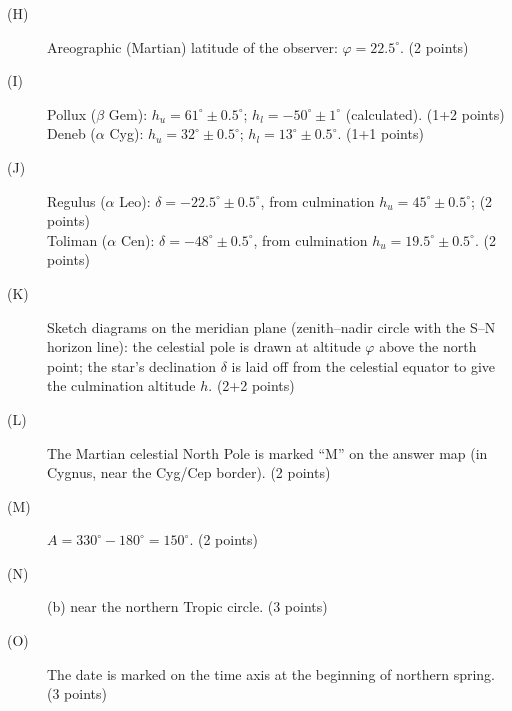 \begin{description}
\item[(H)] Areographic (Martian) latitude of the observer:
  $\varphi = 22.5^\circ$. \hfill(2 points)
\item[(I)] Pollux ($\beta$ Gem):
  $h_u = 61^\circ \pm 0.5^\circ$;
  $h_l = -50^\circ \pm 1^\circ$ (calculated). \hfill(1+2 points)\\
  Deneb ($\alpha$ Cyg):
  $h_u = 32^\circ \pm 0.5^\circ$;
  $h_l = 13^\circ \pm 0.5^\circ$. \hfill(1+1 points)
\item[(J)] Regulus ($\alpha$ Leo):
  $\delta = -22.5^\circ \pm 0.5^\circ$, from culmination
  $h_u = 45^\circ \pm 0.5^\circ$; \hfill(2 points)\\
  Toliman ($\alpha$ Cen):
  $\delta = -48^\circ \pm 0.5^\circ$, from culmination
  $h_u = 19.5^\circ \pm 0.5^\circ$. \hfill(2 points)
\item[(K)] Sketch diagrams on the meridian plane (zenith--nadir circle with
  the S--N horizon line): the celestial pole is drawn at altitude $\varphi$
  above the north point; the star's declination $\delta$ is laid off from
  the celestial equator to give the culmination altitude $h$.
  \hfill(2+2 points)
\item[(L)] The Martian celestial North Pole is marked ``M'' on the answer
  map (in Cygnus, near the Cyg/Cep border). \hfill(2 points)
\item[(M)] $A = 330^\circ - 180^\circ = 150^\circ$. \hfill(2 points)
\item[(N)] (b) near the northern Tropic circle. \hfill(3 points)
\item[(O)] The date is marked on the time axis at the beginning of northern
  spring. \hfill(3 points)
\end{description}

